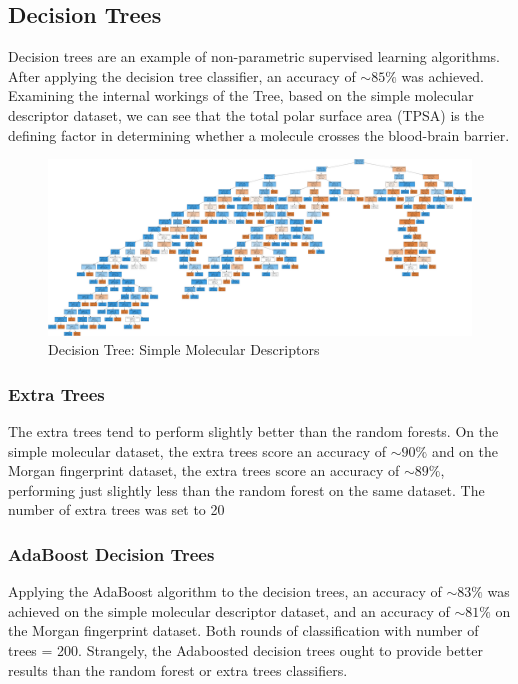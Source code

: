 \documentclass[a4paper,12pt]{report}
\begin{document}
		\subsection{Decision Trees}
				Decision trees are an example of non-parametric supervised learning algorithms.
				After applying the decision tree classifier, an accuracy of $\sim85\%$ was achieved. Examining the internal workings of the Tree, based on the simple molecular descriptor dataset, we can see that the total polar surface area (TPSA) is the defining factor in determining whether a molecule crosses the blood-brain barrier.
				\begin{figure}[H]
					\centering
					\includegraphics[width=\textwidth,scale=1,totalheight=0.4\textheight]{images/bbb_tree_smd}
					\caption{Decision Tree: Simple Molecular Descriptors}
					\label{fig:bbb_tree_smd}
				\end{figure}		
				\subsubsection{Extra Trees}
				The extra trees tend to perform slightly better than the random forests. On the simple molecular dataset, the extra trees score an accuracy of $\sim90\%$ and on the Morgan fingerprint dataset, the extra trees score an accuracy of $\sim89\%$, performing just slightly less than the random forest on the same dataset. The number of extra trees was set to 20
				\subsubsection{AdaBoost Decision Trees}
				Applying the AdaBoost algorithm to the decision trees, an accuracy of $\sim83\%$ was achieved on the simple molecular descriptor dataset, and an accuracy of $\sim81\%$ on the Morgan fingerprint dataset. Both rounds of classification with number of trees = 200. Strangely, the Adaboosted decision trees ought to provide better results than the random forest or extra trees classifiers. 
\end{document}
